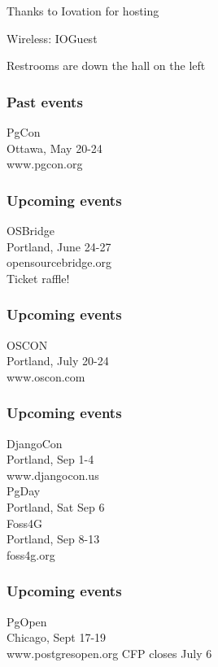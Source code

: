 \documentclass{beamer}
\begin{document}

\frame
{
  \begin{center}
  \item[]Thanks to Iovation for hosting
  \item[]Wireless: IOGuest
  \item[]Restrooms are down the hall on the left
  \end{center}
}

\frame
{
  \frametitle{Past events}
  \begin{center}
{\large PgCon\\}
Ottawa, May 20-24\\
www.pgcon.org
  \end{center}
}
\frame
{
  \frametitle{Upcoming events}
  \begin{center}
{\large OSBridge\\}
Portland, June 24-27\\
opensourcebridge.org\\
Ticket raffle!
  \end{center}
}

\frame
{
  \frametitle{Upcoming events}
  \begin{center}
{\large OSCON\\}
Portland, July 20-24\\
www.oscon.com
  \end{center}
}

\frame
{
  \frametitle{Upcoming events}
  \begin{center}
{\large DjangoCon\\}
Portland, Sep 1-4\\
www.djangocon.us\\
\vspace{5 mm}
{\large PgDay\\}
Portland, Sat Sep 6\\
\vspace{5 mm}
{\large Foss4G\\}
Portland, Sep 8-13\\
foss4g.org
  \end{center}
}

\frame
{
  \frametitle{Upcoming events}
  \begin{center}
{\large PgOpen\\}
Chicago, Sept 17-19\\
www.postgresopen.org
CFP closes July 6
  \end{center}
}
\end{document}
